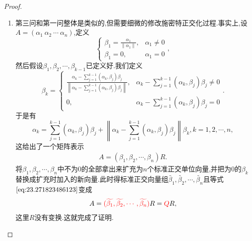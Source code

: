 \documentclass[../../main.tex]{subfiles}%
\begin{document}
\begin{proof}
\begin{enumerate}
\item 第三问和第一问整体是类似的,但需要细微的修改施密特正交化过程.事实上,设\( A = (\alpha_1\ \alpha_2\ \cdots\ \alpha_n) \),定义
\[
\begin{cases}
\beta_1 = \frac{\alpha_1}{\|\alpha_1\|}, & \alpha_1 \neq 0 \\
\beta_1 = 0, & \alpha_1 = 0
\end{cases},
\]
然后假设\( \beta_1, \beta_2, \cdots, \beta_{k - 1} \)已定义好.我们定义
\[
\beta_k = \begin{cases}
\frac{\alpha_k - \sum\limits_{j=1}^{k - 1} (\alpha_k, \beta_j) \beta_j}{\left\| \alpha_k - \sum\limits_{j=1}^{k - 1} (\alpha_k, \beta_j) \beta_j \right\|}, & \alpha_k - \sum_{j=1}^{k - 1} (\alpha_k, \beta_j) \beta_j \neq 0 \\
0, & \alpha_k - \sum_{j=1}^{k - 1} (\alpha_k, \beta_j) \beta_j = 0
\end{cases}.
\]
于是有
\[
\alpha_k = \sum_{j=1}^{k - 1} (\alpha_k, \beta_j) \beta_j + \left\| \alpha_k - \sum_{j=1}^{k - 1} (\alpha_k, \beta_j) \beta_j \right\| \beta_k, k = 1, 2, \cdots, n,
\]
这给出了一个矩阵表示
\begin{align}
A = (\beta_1, \beta_2, \cdots, \beta_n) R. \label{eq:23.271823486123}
\end{align}
将\( \beta_1, \beta_2, \cdots, \beta_n \)中不为0的全部拿出来扩充为\( n \)个标准正交单位向量,并把为0的\( \beta_k \)替换成扩充时加入的新向量.此时得标准正交向量组\( \widetilde{\beta_1}, \widetilde{\beta_2}, \cdots, \widetilde{\beta_n} \)且等式\(\eqref{eq:23.271823486123}\)变成
\[
A = {\color{red} (\widetilde{\beta_1}, \widetilde{\beta_2}, \cdots, \widetilde{\beta_n})} R = {\color{red} Q}R,
\]
这里\( R \)没有变换.这就完成了证明.
\end{enumerate}

\end{proof}
\end{document}
